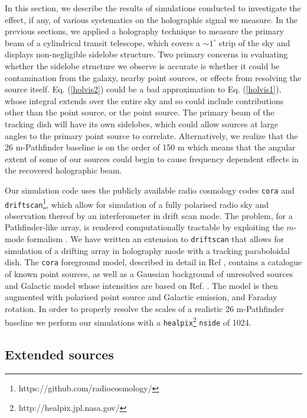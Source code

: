 In this section, we describe the results of simulations conducted to investigate the effect, if any, of various systematics on the holographic signal we measure. In the previous sections, we applied a holography technique to measure the primary beam of a cylindrical transit telescope, which covers a $\sim 1^{\circ}$ strip of the sky and displays non-negligible sidelobe structure. Two primary concerns in evaluating whether the sidelobe structure we observe is accurate is whether it could be contamination from the galaxy, nearby point sources, or effects from resolving the source itself. Eq. (\ref{holvis2}) could be a bad approximation to Eq. (\ref{holvis1}), whose integral extends over the entire sky and so could include contributions other than the point source, or the point source. The primary beam of the tracking dish will have its own sidelobes, which could allow sources at large angles to the primary point source to correlate. Alternatively, we realize that the 26 m-Pathfinder baseline is on the order of 150 m which means that the angular extent of some of our sources could begin to cause frequency dependent effects in the recovered holographic beam. 

Our simulation code uses the publicly available radio cosmology codes \texttt{cora} and \texttt{driftscan}\footnote{https://github.com/radiocosmology/}, which allow for simulation of a fully polarised radio sky and observation thereof by an interferometer in drift scan mode. The problem, for a Pathfinder-like array, is rendered computationally tractable by exploiting the $m$-mode formalism \citep{mmodes1, mmodes2}. We have written an extension to \texttt{driftscan} that allows for simulation of a drifting array in holography mode with a tracking paraboloidal dish. The \texttt{cora} foreground model, described in detail in Ref \citep{mmodes2}, contains a catalogue of known point sources, as well as a Gaussian background of unresolved sources and Galactic model whose intensities are based on Ref. \citep{santoscoorayknox}. The model is then augmented with polarised point source and Galactic emission, and Faraday rotation. In order to properly resolve the scales of a realistic 26 m-Pathfinder baseline we perform our simulations with a \texttt{healpix}\footnote{http://healpix.jpl.nasa.gov/} \citep{gorski} \texttt{nside} of 1024.


\subsection{Extended sources}

